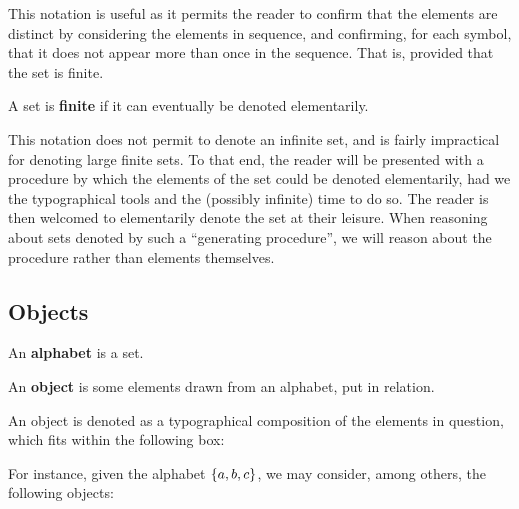 This notation is useful as it permits the reader to confirm that the elements
are distinct by considering the elements in sequence, and confirming, for each
symbol, that it does not appear more than once in the sequence. That is,
provided that the set is finite.

\begin{notion}

A set is \textbf{finite} if it can eventually be denoted elementarily.

\end{notion}

This notation does not permit to denote an infinite set, and is fairly
impractical for denoting large finite sets. To that end, the reader will be
presented with a procedure by which the elements of the set could be denoted
elementarily, had we the typographical tools and the (possibly infinite) time
to do so. The reader is then welcomed to elementarily denote the set at their
leisure. When reasoning about sets denoted by such a ``generating procedure'',
we will reason about the procedure rather than elements themselves.

\subsection{Objects}

\begin{definition}

An \textbf{alphabet} is a set.

\end{definition}

\begin{definition}

An \textbf{object} is some elements drawn from an alphabet, put in relation.

\end{definition}

\begin{notation}

An object is denoted as a typographical composition of the elements in
question, which fits within the following box:

\begin{center}
\end{center}

\end{notation}

For instance, given the alphabet $\left\{{a,b,c}\right\}$, we may consider, among
others, the following objects:


